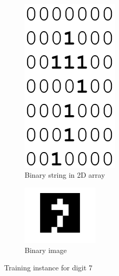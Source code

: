 \documentclass[paper=letter, fontsize=10pt]{scrartcl} %
\numberwithin{equation}{section} %
\numberwithin{figure}{section} %
\numberwithin{table}{section} %
\begin{document}
        ~ %
\begin{figure}
        \centering 
       \begin{subfigure}[b]{0.4\textwidth}
\centering
                \includegraphics[scale=0.25]{digit7raw.png}
                \caption{Binary string in 2D array}
                \label{fig:seven2d}
        \end{subfigure}
\begin{subfigure}[b]{0.4\textwidth}
\centering
                \includegraphics[trim=1cm 1cm 1cm 1cm, width=0.4\textwidth]{digit7.png}
                \caption{Binary image}
                \label{fig:sevenim}
        \end{subfigure}
        \caption{Training instance for digit 7}\label{fig:animals}
\end{figure}
\end{document}
